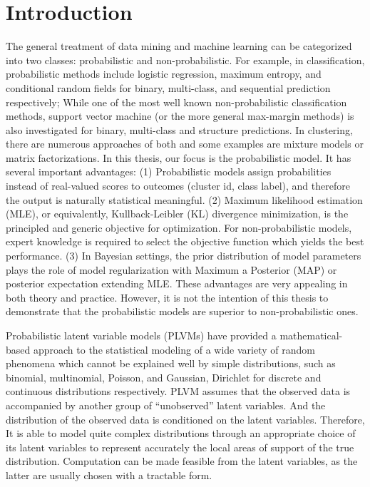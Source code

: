 \chapter{Introduction}

The general treatment of data mining and machine learning can be categorized
into two classes: probabilistic and non-probabilistic. For example, in
classification, probabilistic methods include logistic regression, maximum
entropy, and conditional random fields for binary, multi-class, and sequential
prediction respectively; While one of the most well known non-probabilistic
classification methods, support vector machine (or the more general max-margin
methods) is also investigated for binary, multi-class and structure
predictions. In clustering, there are numerous approaches of both and some
examples are mixture models or matrix factorizations. In this thesis, our focus
is the probabilistic model. It has several important advantages: (1)
Probabilistic models assign probabilities instead of real-valued scores to
outcomes (cluster id, class label), and therefore the output is naturally
statistical meaningful.  (2) Maximum likelihood estimation (MLE), or
equivalently, Kullback-Leibler (KL) divergence minimization, is the principled
and generic objective for optimization. For non-probabilistic models, expert
knowledge is required to select the objective function which yields the best
performance.  (3) In Bayesian settings, the prior distribution of model
parameters plays the role of model regularization with Maximum a Posterior (MAP)
or posterior expectation extending MLE. These advantages are very appealing in
both theory and practice. However, it is not the intention of this thesis to
demonstrate that the probabilistic models are superior to non-probabilistic
ones.

Probabilistic latent variable models (PLVMs) have provided a mathematical-based
approach to the statistical modeling of a wide variety of random phenomena which
cannot be explained well by simple distributions, such as binomial, multinomial,
Poisson, and Gaussian, Dirichlet for discrete and continuous distributions
respectively. PLVM assumes that the observed data is accompanied by another
group of ``unobserved'' latent variables. And the distribution of the observed
data is conditioned on the latent variables. Therefore, It is able to model
quite complex distributions through an appropriate choice of its latent
variables to represent accurately the local areas of support of the true
distribution. Computation can be made feasible from the latent variables, as the
latter are usually chosen with a tractable form.

